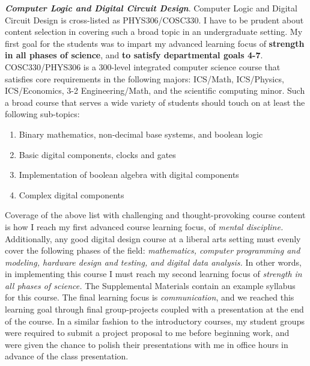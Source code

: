 \documentclass[../../../main.tex]{subfiles}
\begin{document}
\label{sec:adv_desc}

\textbf{\textit{Computer Logic and Digital Circuit Design}}. Computer Logic and Digital Circuit Design is cross-listed as PHYS306/COSC330.  I have to be prudent about content selection in covering such a broad topic in an undergraduate setting. My first goal for the students was to impart my advanced learning focus of \textbf{strength in all phases of science}, and \textbf{to satisfy departmental goals 4-7}.  COSC330/PHYS306 is a 300-level integrated computer science course that satisfies core requirements in the following majors: ICS/Math, ICS/Physics, ICS/Economics, 3-2 Engineering/Math, and the scientific computing minor.  Such a broad course that serves a wide variety of students should touch on at least the following sub-topics:

\begin{enumerate}
\item Binary mathematics, non-decimal base systems, and boolean logic
\item Basic digital components, clocks and gates
\item Implementation of boolean algebra with digital components
\item Complex digital components
\end{enumerate}

Coverage of the above list with challenging and thought-provoking course content is how I reach my first advanced course learning focus, of \textit{mental discipline.}  Additionally, any good digital design course at a liberal arts setting must evenly cover the following phases of the field: \textit{mathematics, computer programming and modeling, hardware design and testing, and digital data analysis.}  In other words, in implementing this course I must reach my second learning focus of \textit{strength in all phases of science.}  The Supplemental Materials contain an example syllabus for this course.  The final learning focus is \textit{communication}, and we reached this learning goal through final group-projects coupled with a presentation at the end of the course.  In a similar fashion to the introductory courses, my student groups were required to submit a project proposal to me before beginning work, and were given the chance to polish their presentations with me in office hours in advance of the class presentation. \\ \hspace{0.1cm}
\end{document}

